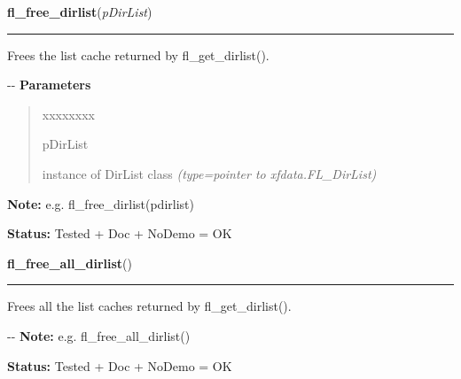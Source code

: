     \vspace{0.5ex}

\hspace{.8\funcindent}\begin{boxedminipage}{\funcwidth}

    \raggedright \textbf{fl\_free\_dirlist}(\textit{pDirList})

    \vspace{-1.5ex}

    \rule{\textwidth}{0.5\fboxrule}
\setlength{\parskip}{2ex}

Frees the list cache returned by fl\_get\_dirlist().

-{}-
\setlength{\parskip}{1ex}
      \textbf{Parameters}
      \vspace{-1ex}

      \begin{quote}
        \begin{Ventry}{xxxxxxxx}

          \item[pDirList]


instance of DirList class
            {\it (type=pointer to xfdata.FL\_DirList)}

        \end{Ventry}

      \end{quote}

\textbf{Note:} 
e.g. fl\_free\_dirlist(pdirlist)


\textbf{Status:} 
Tested + Doc + NoDemo = OK


    \end{boxedminipage}

    \label{xformslib:flfilesys:fl_free_all_dirlist}

    \vspace{0.5ex}

\hspace{.8\funcindent}\begin{boxedminipage}{\funcwidth}

    \raggedright \textbf{fl\_free\_all\_dirlist}()

    \vspace{-1.5ex}

    \rule{\textwidth}{0.5\fboxrule}
\setlength{\parskip}{2ex}

Frees all the list caches returned by fl\_get\_dirlist().

-{}-
\setlength{\parskip}{1ex}
\textbf{Note:} 
e.g. fl\_free\_all\_dirlist()


\textbf{Status:} 
Tested + Doc + NoDemo = OK


    \end{boxedminipage}

